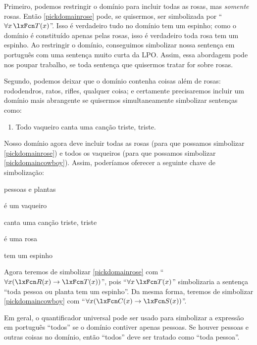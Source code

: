 Primeiro, podemos restringir o domínio para incluir todas as rosas, mas \emph{somente} rosas. Então \cref*{pickdomainrose} pode, se quisermos, ser simbolizada por \textquotedblleft $\forall x\,\atom{T}{x}$\textquotedblright{}. Isso é verdadeiro \ifeff{} tudo no domínio tem um espinho; como o domínio é constituído apenas pelas rosas, isso é verdadeiro \ifeff{} toda rosa tem um espinho. Ao restringir o domínio, conseguimos simbolizar nossa sentença em português com uma sentença muito curta da LPO. Assim, essa abordagem pode nos poupar trabalho, se toda sentença que quisermos tratar for sobre rosas.

Segundo, podemos deixar que o domínio contenha coisas além de rosas: rododendros, ratos, rifles, qualquer coisa; e certamente precisaremos incluir um domínio mais abrangente se quisermos simultaneamente simbolizar sentenças como:
	\begin{enumerate}
\item\label{pickdomaincowboy} Todo vaqueiro canta uma canção triste, triste.
	\end{enumerate}
Nosso domínio agora deve incluir todas as rosas (para que possamos simbolizar \cref*{pickdomainrose}) e todos os vaqueiros (para que possamos simbolizar \cref*{pickdomaincowboy}). Assim, poderíamos oferecer a seguinte chave de simbolização:
	\begin{ekey}
\item[\text{domínio}] pessoas e plantas
\item[\atom{C}{x}]  é um vaqueiro
\item[\atom{S}{x}]  canta uma canção triste, triste
\item[\atom{R}{x}]  é uma rosa
\item[\atom{T}{x}]  tem um espinho
	\end{ekey}
Agora teremos de simbolizar \cref*{pickdomainrose} com \textquotedblleft $\forall x (\atom{R}{x} \eif \atom{T}{x})$\textquotedblright{}, pois \textquotedblleft $\forall x\, \atom{T}{x}$\textquotedblright{} simbolizaria a sentença \textquotedblleft toda pessoa ou planta tem um espinho\textquotedblright{}. Da mesma forma, teremos de simbolizar \cref*{pickdomaincowboy} com \textquotedblleft $\forall x (\atom{C}{x} \eif \atom{S}{x})$\textquotedblright{}.

Em geral, o quantificador universal pode ser usado para simbolizar a expressão em português \textquotedblleft todos\textquotedblright{} se o domínio contiver apenas pessoas. Se houver pessoas e outras coisas no domínio, então \textquotedblleft todos\textquotedblright{} deve ser tratado como \textquotedblleft toda pessoa\textquotedblright{}.


